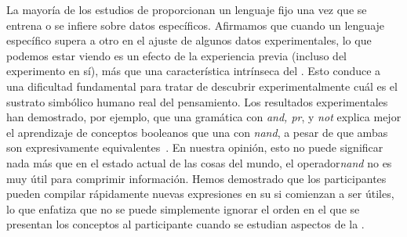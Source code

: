 La mayoría de los estudios de \lot proporcionan un lenguaje fijo una vez que se entrena o se infiere sobre datos específicos. Afirmamos que cuando un lenguaje específico supera a otro en el ajuste de algunos datos experimentales, lo que podemos estar viendo es un efecto de la experiencia previa (incluso del experimento en sí), más que una característica intrínseca del \lot. Esto conduce a una dificultad fundamental para tratar de descubrir experimentalmente cuál es el sustrato simbólico humano real del pensamiento. Los resultados experimentales han demostrado, por ejemplo, que una gramática con \textit{and, pr}, y \textit{not} explica mejor el aprendizaje de conceptos booleanos que una con \textit{nand}, a pesar de que ambas son expresivamente equivalentes~\cite{piantadosi2016logical}. En nuestra opinión, esto no puede significar nada más que en el estado actual de las cosas del mundo, el operador\textit{nand} no es muy útil para comprimir información. Hemos demostrado que los participantes pueden compilar rápidamente nuevas expresiones en su \lot si comienzan a ser útiles, lo que enfatiza que no se puede simplemente ignorar el orden en el que se presentan los conceptos al participante cuando se estudian aspectos de la \lot.

